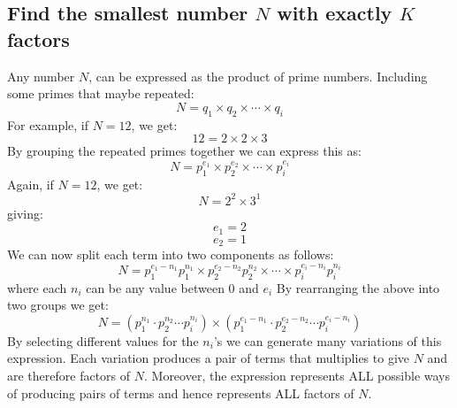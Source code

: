 \documentclass{article}
\begin{document}
\thispagestyle{empty}

\begin{center}
\section*{Find the smallest number $N$ with exactly $K$ factors}
\end{center}

Any number $N$, can be expressed as the product of prime numbers.  
Including some primes that maybe repeated:
$$
N = q_1 \times q_2 \times \cdots \times q_i
$$
For example, if $N = 12$, we get:
$$
12 = 2 \times 2 \times 3
$$
By grouping the repeated primes together we can express this as:
$$
N = p_1 ^ {e_1} \times p_2 ^ {e_2} \times 
\cdots \times p_i ^ {e_i}
$$
Again, if $N = 12$, we get:
$$
N = 2 ^ 2 \times 3 ^ 1
$$
giving:
$$e_1 = 2$$
$$e_2 = 1$$
We can now split each term into two components as follows:
$$
N = 
p_1 ^ {e_1 - n_1} p_1 ^ {n_1} \times 
p_2 ^ {e_2 - n_2} p_2 ^ {n_2} \times 
\cdots \times 
p_i ^ {e_i - n_i} p_i ^ {n_i} 
$$
where each $n_i$ can be any value between $0$ and $e_i$
By rearranging the above into two groups we get:
$$
N = 
( 
p_1 ^ {n_1} \cdot
p_2 ^ {n_2} 
\cdots 
p_i ^ {n_i}
)
\times
(
p_1 ^ {e_1 - n_1} \cdot
p_2 ^ {e_2 - n_2}
\cdots
p_i ^ {e_i - n_i}
)
$$
By selecting different values for the $n_i$'s we can generate many variations of this expression. Each variation produces a pair of terms that multiplies to give $N$ and are therefore factors of $N$.
Moreover, the expression represents ALL possible ways of producing pairs of terms and hence represents ALL factors of $N$.
\end{document}
